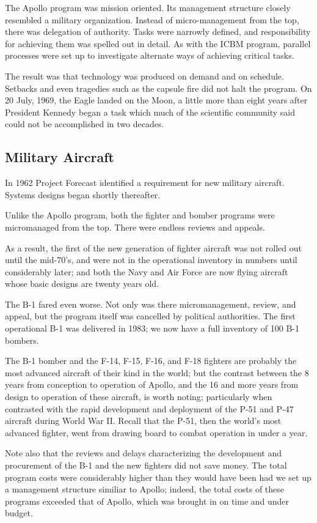 The Apollo program was mission oriented. Its management structure closely resembled a military organization. Instead of micro-management from the top, there was delegation of authority. Tasks were narrowly defined, and responsibility for achieving them was spelled out in detail. As with the ICBM program, parallel processes were set up to investigate alternate ways of achieving critical tasks.

The result was that technology was produced on demand and on schedule. Setbacks and even tragedies such as the capsule fire did not halt the program. On 20 July, 1969, the Eagle landed on the Moon, a little more than eight years after President Kennedy began a task which much of the scientific community said could not be accomplished in two decades.

\subsection{Military Aircraft}
In 1962 Project Forecast identified a requirement for new military aircraft. Systems designs began shortly thereafter.

Unlike the Apollo program, both the fighter and bomber programs were micromanaged from the top. There were endless reviews and appeals.

As a result, the first of the new generation of fighter aircraft was not rolled out until the mid-70's, and were not in the operational inventory in numbers until considerably later; and both the Navy and Air Force are now flying aircraft whose basic designs are twenty years old.

The B-1 fared even worse. Not only was there micromanagement, review, and appeal, but the program itself was cancelled by political authorities. The first operational B-1 was delivered in 1983; we now have a full inventory of 100 B-1 bombers.

The B-1 bomber and the F-14, F-15, F-16, and F-18 fighters are probably the most advanced aircraft of their kind in the world; but the contrast between the 8 years from conception to operation of Apollo, and the 16 and more years from design to operation of these aircraft, is worth noting; particularly when contrasted with the rapid development and deployment of the P-51 and P-47 aircraft during World War II. Recall that the P-51, then the world's most advanced fighter, went from drawing board to combat operation in under a year.

Note also that the reviews and delays characterizing the development and procurement of the B-1 and the new fighters did not save money. The total program costs were considerably higher than they would have been had we set up a management structure similiar to Apollo; indeed, the total costs of these programs exceeded that of Apollo, which was brought in on time and under budget.

